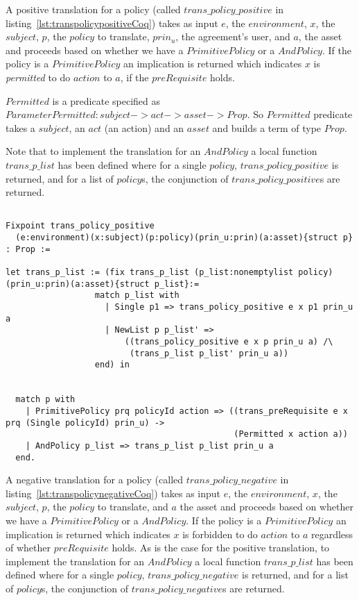 A positive translation for a policy (called $trans\_policy\_positive$ in listing~\ref{lst:transpolicypositiveCoq}) takes as input $e$, the $environment$, $x$, the $subject$, $p$, the $policy$ to translate, $prin_{u}$, the agreement's user, and $a$, the asset and proceeds based on whether we have a $PrimitivePolicy$ or a $AndPolicy$. If the policy is a $PrimitivePolicy$ an implication is returned which indicates $x$ is \emph{permitted} to do $action$ to $a$, if the $preRequisite$ holds. 

$Permitted$ is a predicate specified as $Parameter Permitted : subject -> act -> asset -> Prop.$ So $Permitted$ predicate takes a $subject$, an $act$ (an action) and an $asset$ and builds a term of type $Prop$. 

Note that to implement the translation for an $AndPolicy$ a local function $trans\_p\_list$ has been defined where for a single $policy$, $trans\_policy\_positive$ is returned, and for a list of $policy$s, the conjunction of $trans\_policy\_positive$s are returned.

\begin{lstlisting}

Fixpoint trans_policy_positive
  (e:environment)(x:subject)(p:policy)(prin_u:prin)(a:asset){struct p} : Prop :=

let trans_p_list := (fix trans_p_list (p_list:nonemptylist policy)(prin_u:prin)(a:asset){struct p_list}:=
                  match p_list with
                    | Single p1 => trans_policy_positive e x p1 prin_u a
                    | NewList p p_list' => 
                        ((trans_policy_positive e x p prin_u a) /\ 
                         (trans_p_list p_list' prin_u a))
                  end) in


  match p with
    | PrimitivePolicy prq policyId action => ((trans_preRequisite e x prq (Single policyId) prin_u) ->
                                              (Permitted x action a))
    | AndPolicy p_list => trans_p_list p_list prin_u a
  end.
\end{lstlisting}

A negative translation for a policy (called $trans\_policy\_negative$ in listing~\ref{lst:transpolicynegativeCoq}) takes as input $e$, the $environment$, $x$, the $subject$, $p$, the $policy$ to translate, and $a$ the asset and proceeds based on whether we have a $PrimitivePolicy$ or a $AndPolicy$. If the policy is a $PrimitivePolicy$ an implication is returned which indicates $x$ is forbidden to do $action$ to $a$ regardless of whether $preRequisite$ holds. As is the case for the positive translation, to implement the translation for an $AndPolicy$ a local function $trans\_p\_list$ has been defined where for a single $policy$, $trans\_policy\_negative$ is returned, and for a list of $policy$s, the conjunction of $trans\_policy\_negative$s are returned.


